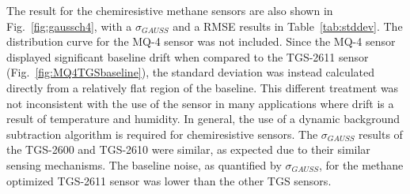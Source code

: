 \documentclass[preprint,sort&compress]{elsarticle}
\begin{document}
			The result for the chemiresistive methane sensors are also shown in Fig.~\ref{fig:gaussch4}, with a $\sigma_{GAUSS}$ and a RMSE results in Table~\ref{tab:stddev}.  The distribution curve for the MQ-4 sensor was not included.  Since the MQ-4 sensor displayed significant baseline drift when compared to the TGS-2611 sensor (Fig.~\ref{fig:MQ4TGSbaseline}), the standard deviation was instead calculated directly from a relatively flat region of the baseline.  This different treatment was not inconsistent with the use of the sensor in many applications where drift is a result of temperature and humidity.   In general, the use of a dynamic background subtraction algorithm is required for chemiresistive sensors.  The $\sigma_{GAUSS}$ results of the TGS-2600 and TGS-2610 were similar, as expected due to their similar sensing mechanisms.  The baseline noise, as quantified by $\sigma_{GAUSS}$, for the methane optimized TGS-2611 sensor was lower than the other TGS sensors.
			
\end{document}

